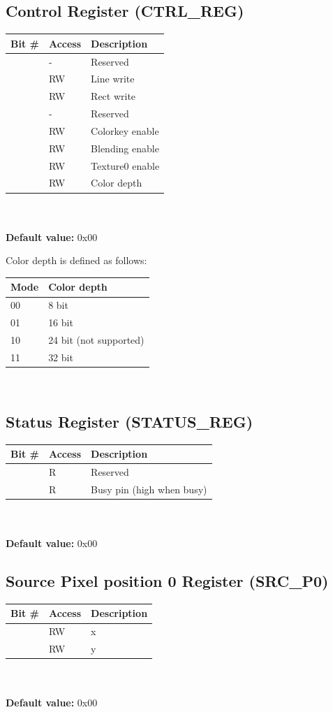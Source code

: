 \documentclass[10pt,a4paper]{article}
\begin{document}
\subsection{Control Register (CTRL\_REG)}
\begin{tabular}{|l|l|l|}
\hline \textbf{Bit \#} & \textbf{Access} & \textbf{Description} \\ 
\hline
\hline [31:10] & - & Reserved \\
\hline [9] & RW & Line write \\
\hline [8] & RW & Rect write \\
\hline [7:5] & - & Reserved \\
\hline [4] & RW & Colorkey enable \\
\hline [3] & RW & Blending enable \\
\hline [2] & RW & Texture0 enable \\
\hline [1:0] & RW & Color depth \\
\hline 
\end{tabular}
\\\\
\textbf{Default value:} 0x00

Color depth is defined as follows:

\begin{tabular}{|l|l|}
\hline \textbf{Mode} & \textbf{Color depth}\\ 
\hline
\hline 00 & 8 bit \\
\hline 01 & 16 bit \\
\hline 10 & 24 bit (not supported) \\
\hline 11 & 32 bit \\
\hline 
\end{tabular} \\

\subsection{Status Register (STATUS\_REG)}
\begin{tabular}{|l|l|l|}
\hline \textbf{Bit \#} & \textbf{Access} & \textbf{Description} \\ 
\hline
\hline [31:1] & R & Reserved \\
\hline [0] & R & Busy pin (high when busy) \\
\hline 
\end{tabular}
\\\\
\textbf{Default value:} 0x00

\subsection{Source Pixel position 0 Register (SRC\_P0)}
\begin{tabular}{|l|l|l|}
\hline \textbf{Bit \#} & \textbf{Access} & \textbf{Description} \\ 
\hline
\hline [31:16] & RW & x \\
\hline [15:0] & RW & y \\
\hline 
\end{tabular}
\\\\
\textbf{Default value:} 0x00
\end{document}
